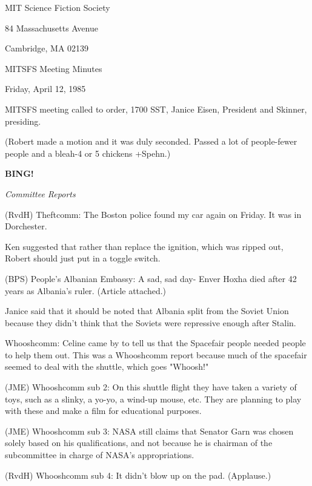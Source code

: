 \documentclass[12pt]{article}
\newcommand{\bing}{{\bf BING!} }
\newcommand{\goto}[1]{\bing \vskip 12pt \centerline{{\em{#1}}}}
\begin{document}
\begin{center}

MIT Science Fiction Society 

84 Massachusetts Avenue

Cambridge, MA 02139

\vspace{12pt}

MITSFS Meeting Minutes 

Friday, April 12, 1985

\end{center}
 
\vspace{18pt}

\setlength{\parskip}{6pt}

\noindent
MITSFS meeting called to order, 1700 SST,
Janice Eisen, President and Skinner, presiding.

(Robert made a motion and it was duly seconded. Passed a lot of people-fewer people and a bleah-4 or 5 chickens +Spehn.)

\goto{Committee Reports}

(RvdH) Theftcomm: The Boston police found my car again on Friday. It was in Dorchester.

Ken suggested that rather than replace the ignition, which was ripped out, Robert should just put in a toggle switch.

(BPS) People's Albanian Embassy: A sad, sad day- Enver Hoxha died after 42 years as Albania's ruler. (Article attached.)

Janice said that it should be noted that Albania split from the Soviet Union because they didn't think that the Soviets were repressive enough after Stalin.

Whooshcomm: Celine came by to tell us that the Spacefair people needed people to help them out. This was a Whooshcomm report because much of the spacefair seemed to deal with the shuttle, which goes "Whoosh!"

(JME) Whooshcomm sub 2: On this shuttle flight they have taken a variety of toys, such as a slinky, a yo-yo, a wind-up mouse, etc. They are planning to play with these and make a film for educational purposes.

(JME) Whooshcomm sub 3: NASA still claims that Senator Garn was chosen solely based on his qualifications, and not because he is chairman of the subcommittee in charge of NASA's appropriations.

(RvdH) Whooshcomm sub 4: It didn't blow up on the pad. (Applause.)
\end{document}
